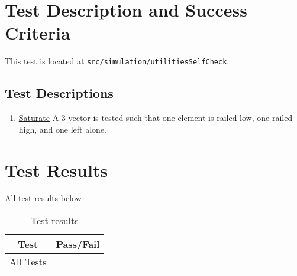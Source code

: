 \section{Test Description and Success Criteria}
This test is located at {\tt src/simulation/utilitiesSelfCheck}. \par

\subsection{Test Descriptions}


\begin{enumerate}
	\item \underline{Saturate} A 3-vector is tested such that one element is railed low, one railed high, and one left alone.
\end{enumerate} 

\section{Test Results}
All test results below

\begin{table}[H]
	\caption{Test results}
	\label{tab:results}
	\centering \fontsize{10}{10}\selectfont
	\begin{tabular}{ c | c  } %
		\hline
		\textbf{Test} 						  		&\textbf{Pass/Fail} \\ \hline
		All Tests	   			&  \\ \hline
	\end{tabular}

\end{table}



\pagebreak %